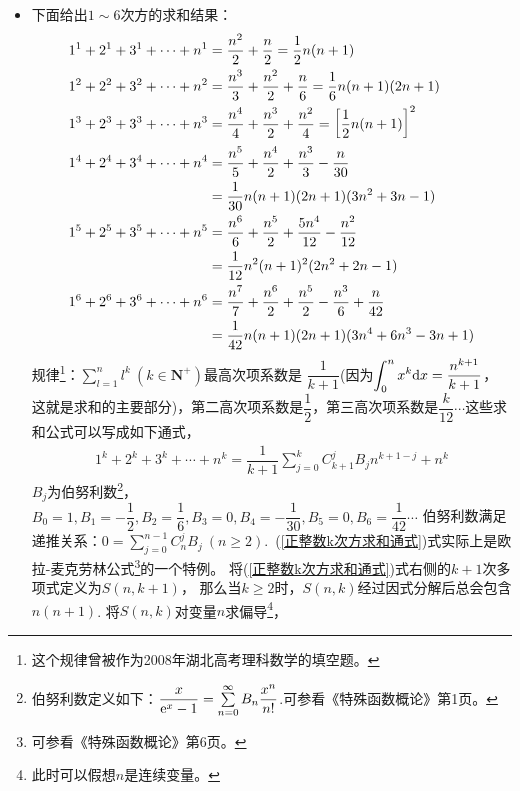 \begin{itemize}[leftmargin=\inteval{\myitemleftmargin}pt,itemsep=
   \inteval{\myitemitempsep}pt,topsep=\inteval{\myitemtopsep}pt]
\item 下面给出$ 1\sim 6 $次方的求和结果：
\begin{align}
    1^1+2^1+3^1+\cdots +n^1 &=\dfrac{n^2}{2}+\dfrac{n}{2} =\dfrac{1}{2}n(n+1)
    \label{正整数1次方求和}\\
    1^2+2^2+3^2+\cdots +n^2&=\dfrac{n^3}{3}+\dfrac{n^2}{2}+\dfrac{n}{6}=\dfrac{1}{6}n(n+1)(2n+1)
    \label{正整数2次方求和} \\
    1^3+2^3+3^3+\cdots +n^3&=\dfrac{n^4}{4}+\dfrac{n^3}{2}+\dfrac{n^2}{4}=
    \left[\dfrac{1}{2}n(n+1) \right]^2 \label{正整数3次方求和}\\
    1^4+2^4+3^4+\cdots +n^4&=\dfrac{n^5}{5}+\dfrac{n^4}{2}+
    \dfrac{n^3}{3}-\dfrac{n}{30} \notag \\
    &=\dfrac{1}{30}n(n+1)(2n+1)(3n^2+3n-1) \label{正整数4次方求和}\\
      1^5+2^5+3^5+\cdots +n^5&=\dfrac{n^6}{6}+\dfrac{n^5}{2}+
      \dfrac{5n^4}{12}-\dfrac{n^2}{12} \notag\\
    &=\dfrac{1}{12}n^2(n+1)^2(2n^2+2n-1) \label{正整数5次方求和} \\
    1^6+2^6+3^6+\cdots +n^6
    &=\dfrac{n^7}{7}+\dfrac{n^6}{2}+\dfrac{n^5}{2}-
    \dfrac{n^3}{6}+\dfrac{n}{42} \notag \\
    &=\dfrac{1}{42}n(n+1)(2n+1)(3n^4+6n^3-3n+1) \label{正整数6次方求和}
\end{align}
规律\footnote{这个规律曾被作为2008年湖北高考理科数学的填空题。}：$ \sum\limits_{l=1}^{n} l^k \ (k\in \textbf{N}^+) $最高次项系数是
$ \dfrac{1}{k+1} $(因为$ \displaystyle \int_0^n x^k\mathrm{d} x=\dfrac{n^{k+1}}{k+1} $，
这就是求和的主要部分)，第二高次项系数是$ \dfrac{1}{2} $，第三高次项系数是$ \dfrac{k}{12} \cdots$这些求和公式可以写成如下通式，
\begin{align}\label{正整数k次方求和通式}
    1^k+2^k+3^k+\cdots +n^k=\dfrac{1}{k+1}
    \sum_{j=0}^{k}C_{k+1}^{j}B_{j}n^{k+1-j}+n^{k}
\end{align}
$ B_j $为伯努利数\footnote{伯努利数定义如下：$ \dfrac{x}{\mathrm{e}^x-1}=
    \sum\limits_{n=0}^{\infty}B_n\dfrac{x^n}{n!} $.可参看《特殊函数概论》第1页。}，
$ B_0=1,B_1=-\dfrac{1}{2},B_2=\dfrac{1}{6},B_3=0,B_4=-\dfrac{1}{30},
B_5=0,B_6=\dfrac{1}{42}\cdots$
伯努利数满足递推关系：$ 0=\sum\limits_{j=0}^{n-1}C_n^jB_j\ (n\geq 2) $.\ 
(\ref{正整数k次方求和通式})式实际上是欧拉-麦克劳林公式\footnote{可参看《特殊函数概论》第6页。}的一个特例。
将(\ref{正整数k次方求和通式})式右侧的$ k+1 $次多项式定义为$ S(n,k+1) $，
那么当$ k\geq 2 $时，$ S(n,k) $经过因式分解后总会包含$ n(n+1) $.
将$ S(n,k) $对变量$ n $求偏导\footnote{此时可以假想$ n $是连续变量。}，

\end{itemize}
